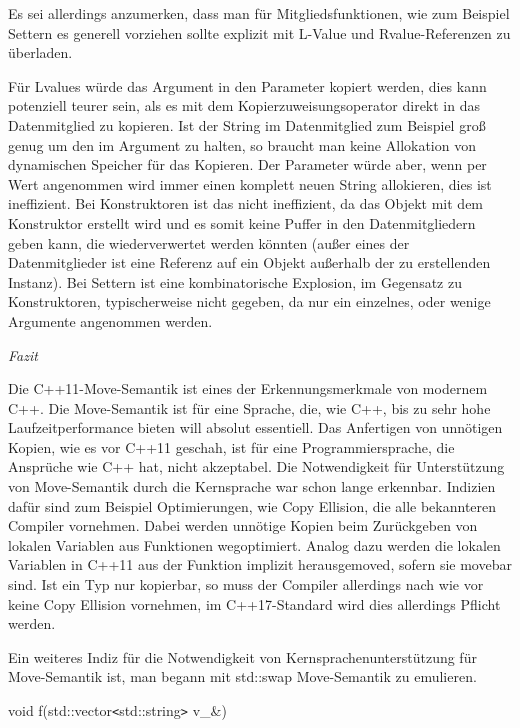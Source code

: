 \documentclass{article}
\begin{document}
Es sei allerdings anzumerken, dass man für Mitgliedsfunktionen, wie zum Beispiel 
Settern es generell vorziehen sollte explizit mit L-Value und Rvalue-Referenzen 
zu überladen.

Für Lvalues würde das Argument in den Parameter kopiert werden, dies kann potenziell 
teurer sein, als es mit dem Kopierzuweisungsoperator direkt in das Datenmitglied 
zu kopieren. Ist der String im Datenmitglied zum Beispiel groß genug um den im 
Argument zu halten, so braucht man keine Allokation von dynamischen Speicher für 
das Kopieren. Der Parameter würde aber, wenn per Wert angenommen wird immer einen 
komplett neuen String allokieren, dies ist ineffizient. Bei Konstruktoren ist das 
nicht ineffizient, da das Objekt mit dem Konstruktor erstellt wird und es somit 
keine Puffer in den Datenmitgliedern geben kann, die wiederverwertet werden könnten 
(außer eines der Datenmitglieder ist eine Referenz auf ein Objekt außerhalb der 
zu erstellenden Instanz). Bei Settern ist eine kombinatorische Explosion, im Gegensatz 
zu Konstruktoren, typischerweise nicht gegeben, da nur ein einzelnes, oder wenige 
Argumente angenommen werden.

\vspace{38pt}
\emph{Fazit}

Die C++11-Move-Semantik ist eines der Erkennungsmerkmale von modernem C++. Die 
Move-Semantik ist für eine Sprache, die, wie C++, bis zu sehr hohe Laufzeitperformance 
bieten will absolut essentiell. Das Anfertigen von unnötigen Kopien, wie es vor 
C++11 geschah, ist für eine Programmiersprache, die Ansprüche wie C++ hat, nicht 
akzeptabel. Die Notwendigkeit für Unterstützung von Move-Semantik durch die Kernsprache 
war schon lange erkennbar. Indizien dafür sind zum Beispiel Optimierungen, wie 
Copy Ellision, die alle bekannteren Compiler vornehmen. Dabei werden unnötige 
Kopien beim Zurückgeben von lokalen Variablen aus Funktionen wegoptimiert. Analog 
dazu werden die lokalen Variablen in C++11 aus der Funktion implizit herausgemoved, 
sofern sie movebar sind. Ist ein Typ nur kopierbar, so muss der Compiler allerdings 
nach wie vor keine Copy Ellision vornehmen, im C++17-Standard wird dies allerdings 
Pflicht werden. 

Ein weiteres Indiz für die Notwendigkeit von Kernsprachenunterstützung für Move-Semantik 
ist, man begann mit std::swap Move-Semantik zu emulieren.

\vspace{12pt}
void f(std::vector\texttt{<}std::string\texttt{>} v\_\&)
\end{document}
